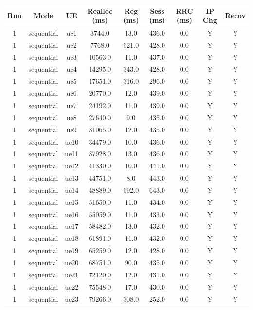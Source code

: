 \begin{table}[ht]
\centering
\begin{tabular}{|c|c|c|c|c|c|c|c|c|}
\hline
Run & Mode & UE & Realloc (ms) & Reg (ms) & Sess (ms) & RRC (ms) & IP Chg & Recov \\
\hline
1 & sequential & ue1 & 3744.0 & 13.0 & 436.0 & 0.0 & Y & Y \\
1 & sequential & ue2 & 7768.0 & 621.0 & 428.0 & 0.0 & Y & Y \\
1 & sequential & ue3 & 10563.0 & 11.0 & 437.0 & 0.0 & Y & Y \\
1 & sequential & ue4 & 14295.0 & 343.0 & 428.0 & 0.0 & Y & Y \\
1 & sequential & ue5 & 17651.0 & 316.0 & 296.0 & 0.0 & Y & Y \\
1 & sequential & ue6 & 20770.0 & 12.0 & 439.0 & 0.0 & Y & Y \\
1 & sequential & ue7 & 24192.0 & 11.0 & 439.0 & 0.0 & Y & Y \\
1 & sequential & ue8 & 27640.0 & 9.0 & 435.0 & 0.0 & Y & Y \\
1 & sequential & ue9 & 31065.0 & 12.0 & 435.0 & 0.0 & Y & Y \\
1 & sequential & ue10 & 34479.0 & 10.0 & 436.0 & 0.0 & Y & Y \\
1 & sequential & ue11 & 37928.0 & 13.0 & 436.0 & 0.0 & Y & Y \\
1 & sequential & ue12 & 41330.0 & 10.0 & 441.0 & 0.0 & Y & Y \\
1 & sequential & ue13 & 44751.0 & 8.0 & 443.0 & 0.0 & Y & Y \\
1 & sequential & ue14 & 48889.0 & 692.0 & 643.0 & 0.0 & Y & Y \\
1 & sequential & ue15 & 51650.0 & 11.0 & 434.0 & 0.0 & Y & Y \\
1 & sequential & ue16 & 55059.0 & 11.0 & 433.0 & 0.0 & Y & Y \\
1 & sequential & ue17 & 58482.0 & 13.0 & 432.0 & 0.0 & Y & Y \\
1 & sequential & ue18 & 61891.0 & 11.0 & 432.0 & 0.0 & Y & Y \\
1 & sequential & ue19 & 65259.0 & 12.0 & 428.0 & 0.0 & Y & Y \\
1 & sequential & ue20 & 68751.0 & 90.0 & 435.0 & 0.0 & Y & Y \\
1 & sequential & ue21 & 72120.0 & 12.0 & 431.0 & 0.0 & Y & Y \\
1 & sequential & ue22 & 75548.0 & 17.0 & 430.0 & 0.0 & Y & Y \\
1 & sequential & ue23 & 79266.0 & 308.0 & 252.0 & 0.0 & Y & Y \\

\end{tabular}
\end{table}
